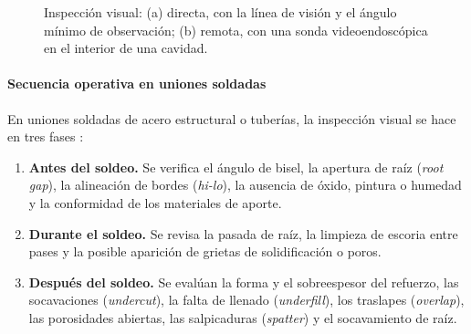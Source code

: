 \begin{figure}[ht]
\centering
{}
\caption{Inspección visual: (a) directa, con la línea de visión y el ángulo mínimo de
observación; (b) remota, con una sonda videoendoscópica en el interior de una
cavidad.}
\label{fig:vt-directa-remota}
\end{figure}

\paragraph{Secuencia operativa en uniones soldadas}

En uniones soldadas de acero estructural o tuberías, la inspección visual se hace en
tres fases \parencite{iso17637}:

\begin{enumerate}
  \item \textbf{Antes del soldeo.} Se verifica el ángulo de bisel, la apertura de
        raíz (\textit{root gap}), la alineación de bordes (\textit{hi-lo}), la
        ausencia de óxido, pintura o humedad y la conformidad de los materiales de
        aporte.
  \item \textbf{Durante el soldeo.} Se revisa la pasada de raíz, la limpieza de
        escoria entre pases y la posible aparición de grietas de solidificación o
        poros.
  \item \textbf{Después del soldeo.} Se evalúan la forma y el sobreespesor del
        refuerzo, las socavaciones (\textit{undercut}), la falta de llenado
        (\textit{underfill}), los traslapes (\textit{overlap}), las porosidades
        abiertas, las salpicaduras (\textit{spatter}) y el socavamiento de raíz.
\end{enumerate}

